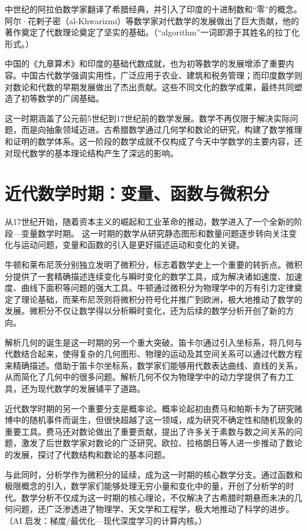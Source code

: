 中世纪的阿拉伯数学家翻译了希腊经典，并引入了印度的十进制数和“零”的概念。阿尔·花剌子密（al-Khwarizmi）等数学家对代数学的发展做出了巨大贡献，他的著作奠定了代数理论奠定了坚实的基础。{（“algorithm”一词即源于其姓名的拉丁化形式。）}

中国的《九章算术》和印度的基础代数成就，也为初等数学的发展增添了重要内容。中国古代数学强调实用性，广泛应用于农业、建筑和税务管理；而印度数学则对数论和代数的早期发展做出了杰出贡献。这些不同文化的数学成果，最终共同塑造了初等数学的广阔基础。

这一时期涵盖了公元前5世纪到17世纪前的数学发展。数学不再仅限于解决实际问题，而是向抽象领域迈进。古希腊数学通过几何学和数论的研究，构建了数学推理和证明的数学体系。这一阶段的数学成就不仅构成了今天中学数学的主要内容，还对现代数学的基本理论结构产生了深远的影响。

\section{近代数学时期：变量、函数与微积分}
从17世纪开始，随着资本主义的崛起和工业革命的推动，数学进入了一个全新的阶段---变量数学时期。
这一时期的数学从研究静态图形和数量问题逐步转向关注变化与运动问题，变量和函数的引入是更好描述运动和变化的关键。

牛顿和莱布尼茨分别独立发明了微积分，标志着数学史上一个重要的转折点。微积分提供了一套精确描述连续变化与瞬时变化的数学工具，成为解决诸如速度、加速度、曲线下面积等问题的强大工具。牛顿通过微积分为物理学中的万有引力定律奠定了理论基础，而莱布尼茨则将微积分符号化并推广到欧洲，极大地推动了数学的发展。微积分不仅让数学得以分析瞬时变化，还为后续的数学分析开创了新的方向。

解析几何的诞生是这一时期的另一个重大突破。笛卡尔通过引入坐标系，将几何与代数结合起来，使得复杂的几何图形、物理的运动及其空间关系可以通过代数方程来精确描述。借助于笛卡尔坐标系，数学家们能够用代数表达曲线、直线的关系，从而简化了几何中的很多问题。解析几何不仅为物理学中的动力学提供了有力工具，还为现代数学的发展铺平了道路。

近代数学时期的另一个重要分支是概率论。概率论起初由费马和帕斯卡为了研究赌博中的随机事件而诞生，但很快超越了这一领域，成为研究不确定性和随机现象的重要工具。费马还对数论做出了重要贡献，提出了许多关于素数与数之间关系的问题，激发了后世数学家对数论的广泛研究。欧拉、拉格朗日等人进一步推动了数论的发展，探讨了代数结构和数论的基本问题。

与此同时，分析学作为微积分的延续，成为这一时期的核心数学分支。通过函数和极限概念的引入，数学家们能够处理无穷小量和变化中的量，开创了分析学的时代。数学分析不仅成为这一时期的核心理论，不仅解决了古希腊时期悬而未决的几何问题，还广泛渗透进了物理学、天文学和工程学，极大地推动了科学的进步。{（AI 启发：梯度/最优化—现代深度学习的计算内核。）}

